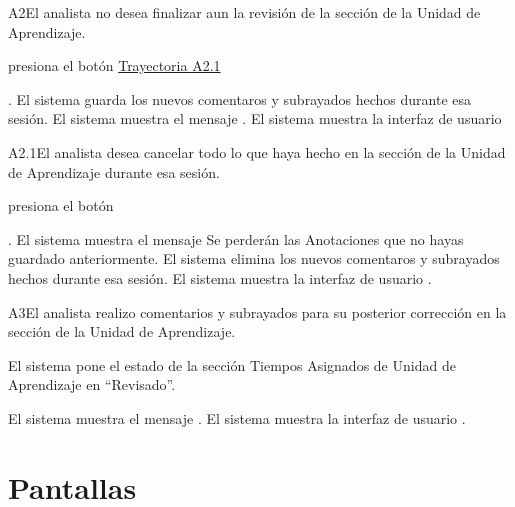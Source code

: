 	
\begin{UCtrayectoriaA}{A2}{El analista no desea finalizar aun la revisión de la sección de la Unidad de Aprendizaje.}

    \hypertarget{SP2-CU8-A2}{\UCpaso[\UCactor] presiona el botón  \hyperlink{SP2-CU8-A2.1}{Trayectoria A2.1}}. 
    \UCpaso El sistema guarda los nuevos comentaros y subrayados hechos durante esa sesión.
    \UCpaso El sistema muestra el mensaje .
    \UCpaso El sistema muestra la interfaz de usuario 
\end{UCtrayectoriaA}

\begin{UCtrayectoriaA}{A2.1}{El analista desea cancelar todo lo que haya hecho en la sección de la Unidad de Aprendizaje durante esa sesión.}

	\hypertarget{SP2-CU8-A2.1}{\UCpaso[\UCactor] presiona el botón }. 
    \UCpaso El sistema muestra el mensaje 
Se perderán las Anotaciones que no hayas guardado anteriormente. 
    \UCpaso El sistema elimina los nuevos comentaros y subrayados hechos durante esa sesión.
    \UCpaso El sistema muestra la interfaz de usuario .
\end{UCtrayectoriaA}

	
\begin{UCtrayectoriaA}{A3}{El analista realizo comentarios y subrayados para su posterior corrección en la sección de la Unidad de Aprendizaje.} 

	\hypertarget{SP2-CU8-A3}{\UCpaso El sistema pone el estado de la sección Tiempos Asignados de Unidad de Aprendizaje en “Revisado”.}
    \UCpaso El sistema muestra el mensaje .
    \UCpaso El sistema muestra la interfaz de usuario .
\end{UCtrayectoriaA}

\chapter{Pantallas}

